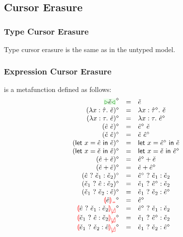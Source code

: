 \documentclass{article}
\begin{document}
\subsection{Cursor Erasure}
\subsubsection{Type Cursor Erasure}
Type cursor erasure is the same as in the untyped model.

\subsubsection{Expression Cursor Erasure}
\judgbox{\ensuremath{\cursorErase{\ZMV}}} is a metafunction defined as follows:
%
\[\begin{array}{rcl}
  \cursorErasesToRow{\ZCursor{\ECMV}}{\ECMV} \\
  \cursorErasesToRow{(\ZLamT{x}{\ZTMV}{\ECMV})}{\ECLam{x}{\cursorErase{\ZTMV}}{\ECMV}} \\
  \cursorErasesToRow{(\ZLamE{x}{\TMV}{\ZMV})}{\ECLam{x}{\TMV}{\cursorErase{\ZMV}}} \\
  \cursorErasesToRow{(\ZApL{\ZMV}{\ECMV})}{\ECAp{\cursorErase{\ZMV}}{\ECMV}} \\
  \cursorErasesToRow{(\ZApR{\ECMV}{\ZMV})}{\ECAp{\ECMV}{\cursorErase{\ZMV}}} \\
  \cursorErasesToRow{(\ZLetL{x}{\ZMV}{\ECMV})}{\ECLet{x}{\cursorErase{\ZMV}}{\ECMV}} \\
  \cursorErasesToRow{(\ZLetR{x}{\ECMV}{\ZMV})}{\ECLet{x}{\ECMV}{\cursorErase{\ZMV}}} \\
  \cursorErasesToRow{(\ZPlusL{\ZMV}{\ECMV})}{\ECPlus{\cursorErase{\ZMV}}{\ECMV}} \\
  \cursorErasesToRow{(\ZPlusR{\ECMV}{\ZMV})}{\ECPlus{\ECMV}{\cursorErase{\ZMV}}} \\
  \cursorErasesToRow{(\ZIfC{\ZMV}{\ECMV_1}{\ECMV_2})}{\ECIf{\cursorErase{\ZMV}}{\ECMV_1}{\ECMV_2}} \\
  \cursorErasesToRow{(\ZIfL{\ECMV_1}{\ZMV}{\ECMV_2})}{\ECIf{\ECMV_1}{\cursorErase{\ZMV}}{\ECMV_2}} \\
  \cursorErasesToRow{(\ZIfL{\ECMV_1}{\ECMV_2}{\ZMV})}{\ECIf{\ECMV_1}{\ECMV_2}{\cursorErase{\ZMV}}} \\
  \cursorErasesToRow{\ZInconType{\ZMV}}{\cursorErase{\ZMV}} \\
  \cursorErasesToRow{\ZInconBrC{\ZMV}{\ECMV_1}{\ECMV_2}}{\ECIf{\cursorErase{\ZMV}}{\ECMV_1}{\ECMV_2}} \\
  \cursorErasesToRow{\ZInconBrL{\ECMV_1}{\ZMV}{\ECMV_2}}{\ECIf{\ECMV_1}{\cursorErase{\ZMV}}{\ECMV_2}} \\
  \cursorErasesToRow{\ZInconBrR{\ECMV_1}{\ECMV_2}{\ZMV}}{\ECIf{\ECMV_1}{\ECMV_2}{\cursorErase{\ZMV}}} \\
\end{array}\]
\end{document}
